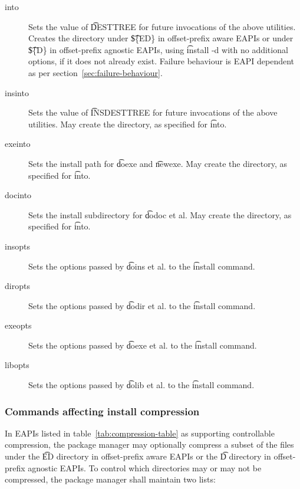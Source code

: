 \begin{description}

\item[into] Sets the value of \t{DESTTREE} for future invocations
    of the above utilities. Creates the directory under \t{\$\{ED\}}
    in offset-prefix aware EAPIs or under \t{\$\{D\}} in offset-prefix
    agnostic EAPIs, using \t{install -d} with no additional options,
    if it does not already exist. Failure behaviour is EAPI dependent
    as per section~\ref{sec:failure-behaviour}.

\item[insinto] Sets the value of \t{INSDESTTREE} for future invocations of the above utilities. May
    create the directory, as specified for \t{into}.

\item[exeinto] Sets the install path for \t{doexe} and \t{newexe}. May create the directory, as specified
    for \t{into}.

\item[docinto] Sets the install subdirectory for \t{dodoc} et al. May create the directory, as specified
    for \t{into}.

\item[insopts] Sets the options passed by \t{doins} et al. to the \t{install} command.

\item[diropts] Sets the options passed by \t{dodir} et al. to the \t{install} command.

\item[exeopts] Sets the options passed by \t{doexe} et al. to the \t{install} command.

\item[libopts] Sets the options passed by \t{dolib} et al. to the \t{install} command.

\end{description}

\subsubsection{Commands affecting install compression}

 In EAPIs listed in table~\ref{tab:compression-table} as
supporting controllable compression, the package manager may optionally compress a subset of the files
under the \t{ED} directory in offset-prefix aware EAPIs or the \t{D} directory in offset-prefix
agnostic EAPIs. To control which directories may or may not be compressed, the package manager shall
maintain two lists:

